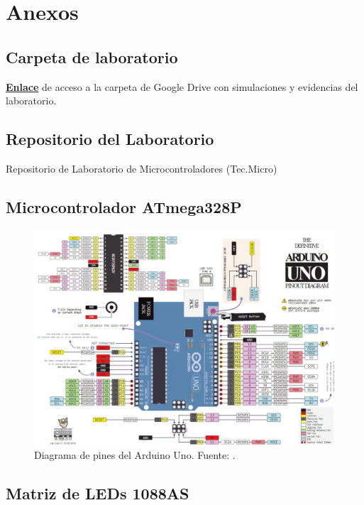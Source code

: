\newpage

\section{Anexos}
\subsection{Carpeta de laboratorio}
\href{https://drive.google.com/drive/folders/1-pCu1uoGqFwTV82Zj6AoLYSWdHQhPP2F?usp=drive_link}{\textbf{Enlace}} de acceso a la carpeta de Google Drive con simulaciones y evidencias del laboratorio.

\subsection{Repositorio del Laboratorio}
Repositorio de Laboratorio de Microcontroladores (Tec.Micro) \cite{utec_tecmicro}


\subsection{Microcontrolador ATmega328P}\label{anexo:Microcontrolador_ATmega328P}

\begin{figure}[H]
  \centering
  \includegraphics[width=\linewidth]{./Anexos/Full Arduino Pinout.png}
  \caption{Diagrama de pines del Arduino Uno. Fuente: \cite{arduino_uno_pinout}.}
  \label{fig:arduino-uno-pinout}
\end{figure}


\subsection{Matriz de LEDs 1088AS}\label{anexo:Matriz_de_LEDs_1088AS}

